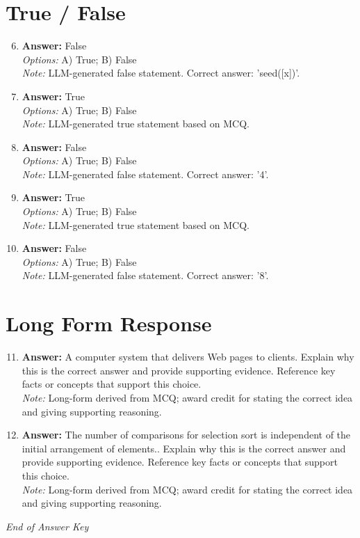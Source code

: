\documentclass[12pt]{article}
\begin{document}
\section*{True / False}
\begin{enumerate}[label=\arabic*.]
\setcounter{enumi}{5}
\item \textbf{Answer:} False
\\ \textit{Options:} A) True; B) False
\\ \textit{Note:} LLM-generated false statement. Correct answer: 'seed([x])'.
\item \textbf{Answer:} True
\\ \textit{Options:} A) True; B) False
\\ \textit{Note:} LLM-generated true statement based on MCQ.
\item \textbf{Answer:} False
\\ \textit{Options:} A) True; B) False
\\ \textit{Note:} LLM-generated false statement. Correct answer: '4'.
\item \textbf{Answer:} True
\\ \textit{Options:} A) True; B) False
\\ \textit{Note:} LLM-generated true statement based on MCQ.
\item \textbf{Answer:} False
\\ \textit{Options:} A) True; B) False
\\ \textit{Note:} LLM-generated false statement. Correct answer: '8'.
\end{enumerate}

\section*{Long Form Response}
\begin{enumerate}[label=\arabic*.]
\setcounter{enumi}{10}
\item \textbf{Answer:} A computer system that delivers Web pages to clients. Explain why this is the correct answer and provide supporting evidence. Reference key facts or concepts that support this choice.
\\ \textit{Note:} Long-form derived from MCQ; award credit for stating the correct idea and giving supporting reasoning.
\item \textbf{Answer:} The number of comparisons for selection sort is independent of the initial arrangement of elements.. Explain why this is the correct answer and provide supporting evidence. Reference key facts or concepts that support this choice.
\\ \textit{Note:} Long-form derived from MCQ; award credit for stating the correct idea and giving supporting reasoning.
\end{enumerate}

\vfill
\noindent\textit{End of Answer Key}
\end{document}
